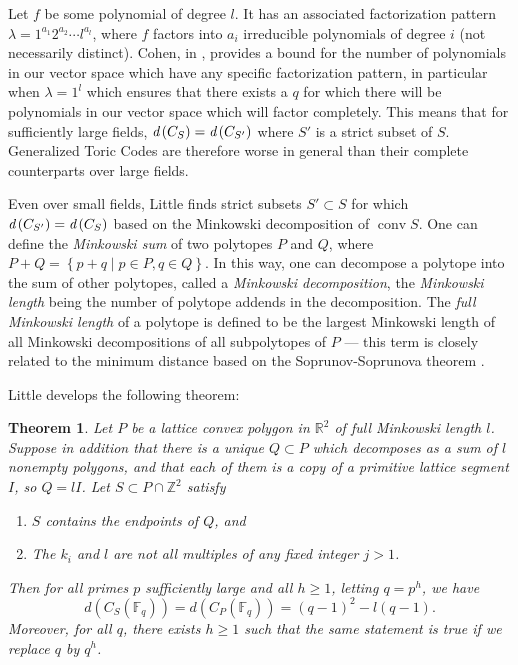 \documentclass[12pt]{amsart}
\theoremstyle{plain}
\newtheorem{Th}{Theorem}[section]
\newcommand{\F}{\mathbb{F}}
\newcommand{\Int}{\mathbb{Z}}
\newcommand{\Reals}{\mathbb{R}}
\DeclareMathOperator{\Convex}{conv}
\newcommand{\dist}[1]{\mathrm{\emph{d}}\left(#1\right)}
\begin{document}
Let $f$ be some polynomial of degree $l$. It has an associated factorization pattern $\lambda = 1^{a_1} 2^{a_2} \cdots l^{a_l}$, where $f$ factors into $a_i$ irreducible polynomials of degree $i$ (not necessarily distinct). Cohen, in \cite{cohen}, provides a bound for the number of polynomials in our vector space which have any specific factorization pattern, in particular when $\lambda = 1^l$ which ensures that there exists a $q$ for which there will be polynomials in our vector space which will factor completely. This means that for sufficiently large fields, $\dist{C_S} = \dist{C_{S'}}$ where $S'$ is a strict subset of $S$. Generalized Toric Codes are therefore worse in general than their complete counterparts over large fields.

Even over small fields, Little finds strict subsets $S' \subset S$ for which $\dist{C_{S'}} = \dist{C_S}$ based on the Minkowski decomposition of $\Convex S$. One can define the \emph{Minkowski sum} of two polytopes $P$ and $Q$, where $P+Q = \left\{p + q \mid p \in P, q \in Q \right\}$. In this way, one can decompose a polytope into the sum of other polytopes, called a \emph{Minkowski decomposition}, the \emph{Minkowski length} being the number of polytope addends in the decomposition. The \emph{full Minkowski length} of a polytope is defined to be the largest Minkowski length of all Minkowski decompositions of all subpolytopes of $P$ --- this term is closely related to the minimum distance based on the Soprunov-Soprunova theorem \cite{is2}.

Little develops the following theorem:

\begin{Th}
\cite{little}
Let $P$ be a lattice convex polygon in $\Reals^2$ of full Minkowski
length $l$.  Suppose in addition that there is a unique $Q \subset P$ 
which decomposes as a sum of $l$ nonempty polygons, and that
each of them is a copy of a primitive lattice segment $I$, so $Q = l I$.  
Let $S \subset P \cap \Int^2$ satisfy 
\begin{enumerate}
\item $S$ contains the endpoints of $Q$, and
\item The $k_i$ and $l$ are not all multiples of any fixed
integer $j > 1$.
\end{enumerate}
Then for all primes $p$ sufficiently large and all $h \ge 1$, letting $q = p^h$,
we have
$$d(C_S(\F_q)) = d(C_P(\F_q)) = (q - 1)^2 - l(q - 1).$$
Moreover, for all $q$, there exists $h \ge 1$ such 
that the same statement is true if we replace $q$ by $q^h$. 
\end{Th}
\end{document}
